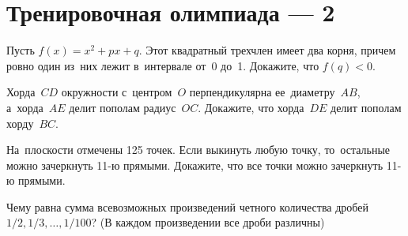 
\section*{Тренировочная олимпиада --- 2}


\begin{problems}

\item
Пусть $f(x) = x^2 + p x + q$.
Этот квадратный трехчлен имеет два корня, причем ровно один из~них лежит
в~интервале от~0 до~1.
Докажите, что $f(q) < 0$.

\item
Хорда~$CD$ окружности с~центром~$O$ перпендикулярна ее~диаметру~$AB$,
а~хорда~$AE$ делит пополам радиус~$OC$.
Докажите, что хорда~$DE$ делит пополам хорду~$BC$.

\item
На~плоскости отмечены 125 точек.
Если выкинуть любую точку, то~остальные можно зачеркнуть 11-ю прямыми.
Докажите, что все точки можно зачеркнуть 11-ю прямыми.

\item
Чему равна сумма всевозможных произведений четного количества дробей
$1 / 2, 1 / 3, \ldots, 1 / 100$?
(В каждом произведении все дроби различны)

\end{problems}

